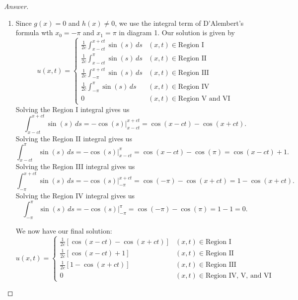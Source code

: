 \documentclass{article}
\theoremstyle{definition}
\renewcommand\qedsymbol{$\blacksquare$}
\newenvironment{ans}{\begin{proof}[Answer]\renewcommand{\qedsymbol}{}}{\end{proof}}
\begin{document}
\begin{ans}
\begin{enumerate}[(1), start = 7, resume*=answers]
    \item Since $g(x) = 0$ and $h(x)\neq 0$, we use the integral term of D'Alembert's formula wth $x_0 = -\pi$ and $x_1 = \pi$ in diagram 1. Our solution is given by
    \[u(x,t) = \begin{cases}
        \frac{1}{2c} \int_{x-ct}^{x+ct}\sin(s)\, ds & (x,t)\in\text{Region I}\\
        \frac{1}{2c} \int_{x-ct}^{\pi}\sin(s)\, ds & (x,t)\in\text{Region II}\\
        \frac{1}{2c} \int_{-\pi}^{x+ct}\sin(s)\, ds & (x,t)\in\text{Region III}\\
        \frac{1}{2c} \int_{-\pi}^{\pi}\sin(s)\, ds & (x,t)\in\text{Region IV}\\
        0 & (x,t) \in \text{Region V and VI}
    \end{cases}\]
    Solving the Region I integral gives us
    \[\int_{x-ct}^{x+ct}\sin(s)\,ds = -\cos(s)|_{x-ct}^{x+ct} = \cos(x-ct) - \cos(x+ct).\]
    Solving the Region II integral gives us
    \[\int_{x-ct}^{\pi}\sin(s)\,ds = -\cos(s)|_{x-ct}^{\pi} = \cos(x-ct) - \cos(\pi) = \cos(x-ct) + 1.\]
    Solving the Region III integral gives us
    \[\int_{-\pi}^{x+ct}\sin(s)\,ds = -\cos(s)|_{-\pi}^{x+ct} = \cos(-\pi) - \cos(x+ct) = 1 - \cos(x+ct).\]
    Solving the Region IV integral gives us
    \[\int_{-\pi}^{\pi}\sin(s)\,ds = -\cos(s)|_{-\pi}^{\pi} = \cos(-\pi) - \cos(\pi) = 1 - 1 = 0.\]

    We now have our final solution:
    \[\boxed{u(x,t) = \begin{cases}
        \frac{1}{2c} \left[\cos(x-ct) - \cos(x+ct)\right] & (x,t)\in\text{Region I}\\
        \frac{1}{2c} \left[\cos(x-ct) + 1\right] & (x,t)\in\text{Region II}\\
        \frac{1}{2c} \left[1 - \cos(x+ct)\right] & (x,t)\in\text{Region III}\\
        0 & (x,t) \in \text{Region IV, V, and VI}
    \end{cases}}\]
\end{enumerate}
\end{ans}
\end{document}
